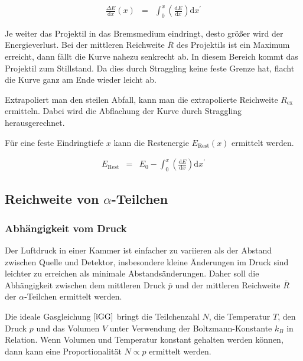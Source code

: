 \documentclass[12pt,a4paper]{scrartcl}
\numberwithin{equation}{section} %
\begin{document}
\begin{eqnarray}
    \frac{\Delta E}{\mathrm dx}(x) &=&
        \int_0^x \left(\frac{\mathrm dE}{\mathrm dx}\right) \mathrm dx^\prime
\end{eqnarray}

Je weiter das Projektil in das Bremsmedium eindringt, desto größer wird der Energieverlust. Bei der mittleren Reichweite $\bar R$ des Projektils ist ein Maximum erreicht, dann fällt die Kurve nahezu senkrecht ab. In diesem Bereich kommt das Projektil zum Stillstand. Da dies durch Straggling keine feste Grenze hat, flacht die Kurve ganz am Ende wieder leicht ab.

Extrapoliert man den steilen Abfall, kann man die extrapolierte Reichweite $R_\mathrm{ex}$ ermitteln. Dabei wird die Abflachung der Kurve durch Straggling herausgerechnet.

Für eine feste Eindringtiefe $x$ kann die Restenergie $E_\mathrm{Rest}(x)$ ermittelt werden.

\begin{eqnarray}
    E_\mathrm{Rest}
        &=& E_0
        - \int_0^x \left(\frac{\mathrm dE}{\mathrm dx}\right) \mathrm dx^\prime
        \label{Restenergie}
\end{eqnarray}

\hypertarget{reichweite-von-alpha-teilchen}{%
\subsection{\texorpdfstring{Reichweite von
$\alpha$-Teilchen}{Reichweite von \textbackslash alpha-Teilchen}}\label{reichweite-von-alpha-teilchen}}

\hypertarget{abhuxe4ngigkeit-vom-druck}{%
\subsubsection{Abhängigkeit vom Druck}\label{abhuxe4ngigkeit-vom-druck}}

Der Luftdruck in einer Kammer ist einfacher zu variieren als der Abstand zwischen Quelle und Detektor, insbesondere kleine Änderungen im Druck sind leichter zu erreichen als minimale Abstandsänderungen. Daher soll die Abhängigkeit zwischen dem mittleren Druck $\bar p$ und der mittleren Reichweite $\bar R$ der $\alpha$-Teilchen ermittelt werden.

Die ideale Gasgleichung $\eqref{iGG}$ bringt die Teilchenzahl $N$, die Temperatur $T$, den Druck $p$ und das Volumen $V$ unter Verwendung der Boltzmann-Konstante $k_B$ in Relation. Wenn Volumen und Temperatur konstant gehalten werden können, dann kann eine Proportionalität $N\propto p$ ermittelt werden.
\end{document}
